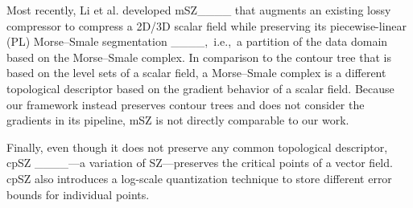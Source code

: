 Most recently, Li et al. developed mSZ____ that augments an existing lossy compressor to compress a 2D/3D scalar field while preserving its piecewise-linear (PL) Morse--Smale segmentation ____,~i.e.,~a partition of the data domain based on the Morse--Smale complex. 
In comparison to the contour tree that is based on the level sets of a scalar field, a Morse--Smale complex is a different topological descriptor based on the gradient behavior of a scalar field.   
Because our framework instead preserves contour trees and does not consider the gradients in its pipeline, mSZ is not directly comparable to our work. 

Finally, even though it does not preserve any common topological descriptor, cpSZ ____---a variation of SZ---preserves the critical points of a vector field. cpSZ also introduces a log-scale quantization technique to store different error bounds for individual points.